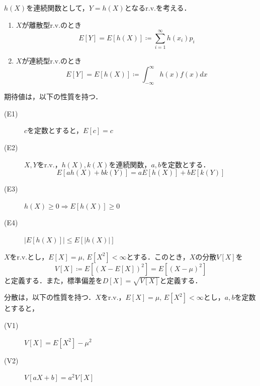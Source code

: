 \documentclass{jsreport}
\begin{document}
\begin{screen}
  \begin{defi}
    $h(X)$を連続関数として，$Y = h(X)$となるr.v.を考える．
    \begin{enumerate}
      \item $X$が離散型r.v.のとき
      \begin{equation}
        E[Y] = E[h(X)] \coloneqq \sum_{i=1}^{\infty} h(x_i)p_i \nonumber
      \end{equation}
      \item $X$が連続型r.v.のとき
      \begin{equation}
        E[Y] = E[h(X)] \coloneqq \int_{-\infty}^{\infty} h(x)f(x) dx \nonumber
      \end{equation}
    \end{enumerate}
  \end{defi}
\end{screen}

期待値は，以下の性質を持つ．
\begin{description}
  \item[(E1)] $c$を定数とすると，$E[c] = c$
  \item[(E2)] $X, Y$をr.v.，$h(X), k(X)$を連続関数，$a,b$を定数とする．
  \begin{equation}
    E[ah(X) + bk(Y)] = aE[h(X)] + bE[k(Y)] \nonumber
  \end{equation}
  \item[(E3)] $h(X) \geq 0 \Longrightarrow E[h(X)] \geq 0$
  \item[(E4)] $|E[h(X)]| \leq E[|h(X)|]$
\end{description}

\begin{screen}
  \begin{defi}[分散]
    $X$をr.v.とし，$E[X] = \mu, \, E[X^2] < \infty$とする．このとき，$X$の分散$V[X]$を
    \begin{equation}
      V[X] \coloneqq E[(X - E[X])^2] = E[(X - \mu)^2] \nonumber
    \end{equation}
    と定義する．また，標準偏差を$D[X] = \sqrt{V[X]}$と定義する．
  \end{defi}
\end{screen}

分散は，以下の性質を持つ．$X$をr.v.，$E[X] = \mu, \, E[X^2] < \infty$とし，$a, b$を定数とすると，
\begin{description}
  \item[(V1)] $V[X] = E[X^2] - \mu^2$
  \item[(V2)] $V[aX + b] = a^2V[X]$
\end{description}
\end{document}

